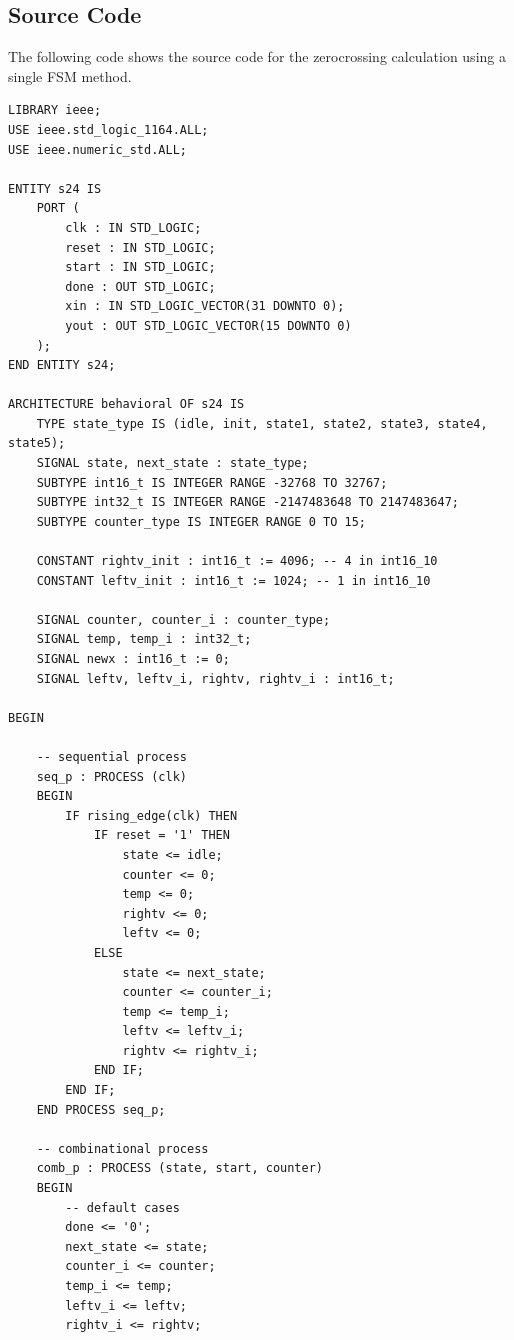 \documentclass[11pt, a4paper]{report}
\begin{document}
\subsection{Source Code}
The following code shows the source code for the zerocrossing calculation using a single FSM method.
\begin{verbatim}
LIBRARY ieee;
USE ieee.std_logic_1164.ALL;
USE ieee.numeric_std.ALL;

ENTITY s24 IS
    PORT (
        clk : IN STD_LOGIC;
        reset : IN STD_LOGIC;
        start : IN STD_LOGIC;
        done : OUT STD_LOGIC;
        xin : IN STD_LOGIC_VECTOR(31 DOWNTO 0);
        yout : OUT STD_LOGIC_VECTOR(15 DOWNTO 0)
    );
END ENTITY s24;

ARCHITECTURE behavioral OF s24 IS
    TYPE state_type IS (idle, init, state1, state2, state3, state4, state5);
    SIGNAL state, next_state : state_type;
    SUBTYPE int16_t IS INTEGER RANGE -32768 TO 32767;
    SUBTYPE int32_t IS INTEGER RANGE -2147483648 TO 2147483647;
    SUBTYPE counter_type IS INTEGER RANGE 0 TO 15;

    CONSTANT rightv_init : int16_t := 4096; -- 4 in int16_10 
    CONSTANT leftv_init : int16_t := 1024; -- 1 in int16_10 

    SIGNAL counter, counter_i : counter_type;
    SIGNAL temp, temp_i : int32_t;
    SIGNAL newx : int16_t := 0;
    SIGNAL leftv, leftv_i, rightv, rightv_i : int16_t;

BEGIN

    -- sequential process 
    seq_p : PROCESS (clk)
    BEGIN
        IF rising_edge(clk) THEN
            IF reset = '1' THEN
                state <= idle;
                counter <= 0;
                temp <= 0;
                rightv <= 0;
                leftv <= 0;
            ELSE
                state <= next_state;
                counter <= counter_i;
                temp <= temp_i;
                leftv <= leftv_i;
                rightv <= rightv_i;
            END IF;
        END IF;
    END PROCESS seq_p;

    -- combinational process 
    comb_p : PROCESS (state, start, counter)
    BEGIN
        -- default cases 
        done <= '0';
        next_state <= state;
        counter_i <= counter;
        temp_i <= temp;
        leftv_i <= leftv;
        rightv_i <= rightv;


\end{verbatim}
\end{document}
